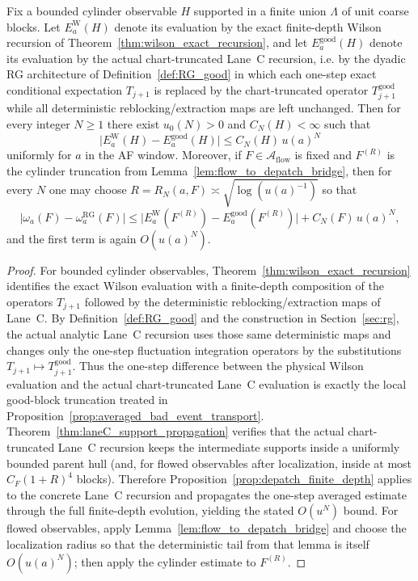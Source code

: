 \begin{proposition}\label{prop:local_transport_closure}
Fix a bounded cylinder observable $H$ supported in a finite union $\Lambda$ of unit coarse blocks.
Let $E_a^{\mathrm W}(H)$ denote its evaluation by the exact finite-depth Wilson recursion of Theorem~\ref{thm:wilson_exact_recursion}, and let $E_a^{\mathrm{good}}(H)$ denote its evaluation by the actual chart-truncated Lane~C recursion, i.e. by the dyadic RG architecture of Definition~\ref{def:RG_good} in which each one-step exact conditional expectation $T_{j+1}$ is replaced by the chart-truncated operator $T_{j+1}^{\mathrm{good}}$ while all deterministic reblocking/extraction maps are left unchanged.
Then for every integer $N\ge 1$ there exist $u_0(N)>0$ and $C_N(H)<\infty$ such that
\[
\big|E_a^{\mathrm W}(H)-E_a^{\mathrm{good}}(H)\big|\le C_N(H)\,u(a)^N
\]
uniformly for $a$ in the AF window.
Moreover, if $F\in\mathcal A_{\mathrm{flow}}$ is fixed and $F^{(R)}$ is the cylinder truncation from Lemma~\ref{lem:flow_to_depatch_bridge}, then for every $N$ one may choose $R=R_N(a,F)\asymp \sqrt{\log(u(a)^{-1})}$ so that
\[
\big|\omega_a(F)-\omega_a^{\mathrm{RG}}(F)\big|
\le
\big|E_a^{\mathrm W}(F^{(R)})-E_a^{\mathrm{good}}(F^{(R)})\big| + C_N(F)\,u(a)^N,
\]
and the first term is again $O(u(a)^N)$.
\end{proposition}

\begin{proof}
For bounded cylinder observables, Theorem~\ref{thm:wilson_exact_recursion} identifies the exact Wilson evaluation with a finite-depth composition of the operators $T_{j+1}$ followed by the deterministic reblocking/extraction maps of Lane~C.
By Definition~\ref{def:RG_good} and the construction in Section~\ref{sec:rg}, the actual analytic Lane~C recursion uses those same deterministic maps and changes only the one-step fluctuation integration operators by the substitutions $T_{j+1}\mapsto T_{j+1}^{\mathrm{good}}$.
Thus the one-step difference between the physical Wilson evaluation and the actual chart-truncated Lane~C evaluation is exactly the local good-block truncation treated in Proposition~\ref{prop:averaged_bad_event_transport}.
Theorem~\ref{thm:laneC_support_propagation} verifies that the actual chart-truncated Lane~C recursion keeps the intermediate supports inside a uniformly bounded parent hull (and, for flowed observables after localization, inside at most $C_F(1+R)^4$ blocks).
Therefore Proposition~\ref{prop:depatch_finite_depth} applies to the concrete Lane~C recursion and propagates the one-step averaged estimate through the full finite-depth evolution, yielding the stated $O(u^N)$ bound.
For flowed observables, apply Lemma~\ref{lem:flow_to_depatch_bridge} and choose the localization radius so that the deterministic tail from that lemma is itself $O(u(a)^N)$; then apply the cylinder estimate to $F^{(R)}$.
\end{proof}

